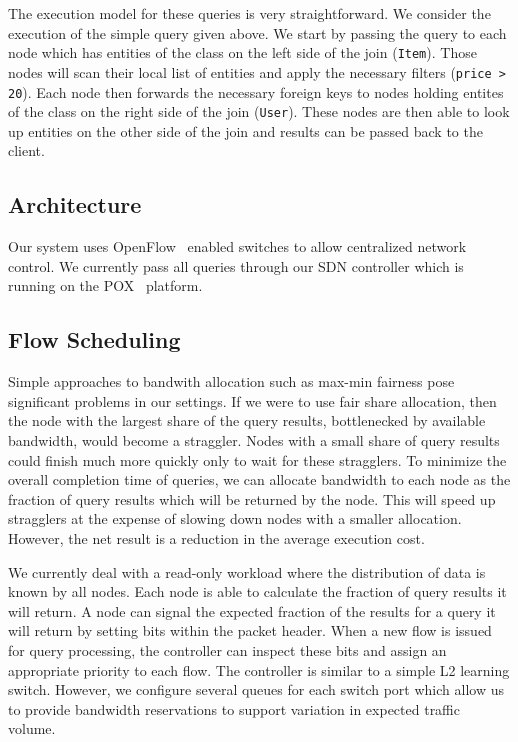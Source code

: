 \documentclass{sig-alternate-2013}
\begin{document}
The execution model for these queries is very straightforward.
We consider the execution of the simple query given above.
We start by passing the query to each node which has entities of the class on the left side of the join (\texttt{Item}).
Those nodes will scan their local list of entities and apply the necessary filters (\texttt{price > 20}).
Each node then forwards the necessary foreign keys to nodes holding entites of the class on the right side of the join (\texttt{User}).
These nodes are then able to look up entities on the other side of the join and results can be passed back to the client.

\subsection{Architecture}

Our system uses OpenFlow~\cite{McKeown2008} enabled switches to allow centralized network control.
We currently pass all queries through our SDN controller which is running on the POX~\cite{Gude2008} platform.

\subsection{Flow Scheduling}

Simple approaches to bandwith allocation such as max-min fairness pose significant problems in our settings.
If we were to use fair share allocation, then the node with the largest share of the query results, bottlenecked by available bandwidth, would become a straggler.
Nodes with a small share of query results could finish much more quickly only to wait for these stragglers.
To minimize the overall completion time of queries, we can allocate bandwidth to each node as the fraction of query results which will be returned by the node.
This will speed up stragglers at the expense of slowing down nodes with a smaller allocation.
However, the net result is a reduction in the average execution cost.

We currently deal with a read-only workload where the distribution of data is known by all nodes.
Each node is able to calculate the fraction of query results it will return.
A node can signal the expected fraction of the results for a query it will return by setting bits within the packet header.
When a new flow is issued for query processing, the controller can inspect these bits and assign an appropriate priority to each flow.
The controller is similar to a simple L2 learning switch.
However, we configure several queues for each switch port which allow us to provide bandwidth reservations to support variation in expected traffic volume.
\end{document}
